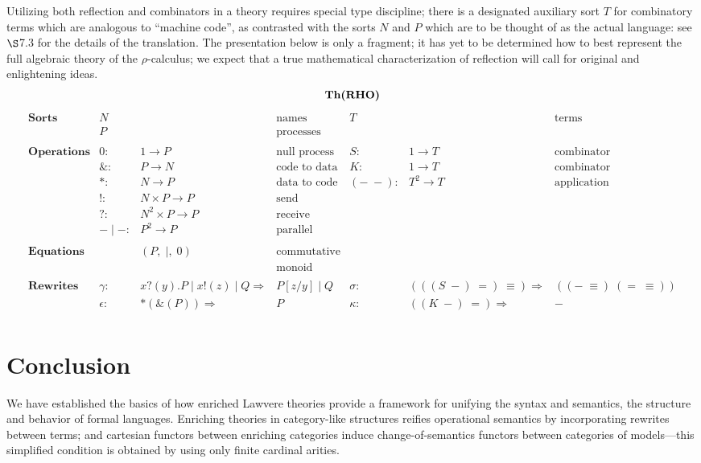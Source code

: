 \documentclass{amsart}
\theoremstyle{definition}
\newcommand{\maps}{\colon}
\begin{document}
Utilizing both reflection and combinators in a theory requires special type discipline; there is a designated auxiliary sort $T$ for combinatory terms which are analogous to ``machine code'', as contrasted with the sorts $N$ and $P$ which are to be thought of as the actual language: see \cite{roswelt} $\S$7.3 for the details of the translation. The presentation below is only a fragment; it has yet to be determined how to best represent the full algebraic theory of the $\rho$-calculus; we expect that a true mathematical characterization of reflection will call for original and enlightening ideas.\\

\[\textbf{\text{Th(RHO)}}\]
\[\begin{array}{lrllrll}
	\textbf{Sorts} & N && \text{names} & T && \text{terms}\\
	& P && \text{processes} &&&\\\\
	\textbf{Operations} & 0\maps & 1 \to P & \text{null process} & S\maps & 1\to T & \text{combinator}\\
	& \&\maps & P \to N & \text{code to data} & K\maps & 1\to T & \text{combinator}\\
	& *\maps & N \to P & \text{data to code} & (-\;-)\maps & T^2 \to T & \text{application}\\
	& !\maps & N\times P \to P & \text{send} &&&\\
	& ?\maps & N^2\times P \to P & \text{receive} &&&\\
		& -\; |\; - \maps & P^2 \to P & \text{parallel} &&&\\\\
	\textbf{Equations} && (P,\; |,\; 0) & \text{commutative} &&&\\
	&&& \text{monoid} &&&\\\\
	\textbf{Rewrites} & \gamma\maps & x?(y).P\; |\; x!(z)\; |\; Q \Rightarrow & P[z/y]\; |\; Q & \sigma\maps & (((S\; -)\; =)\; \equiv) \Rightarrow & ((-\; \equiv)\;(=\; \equiv))\\
	& \epsilon\maps & *(\&(P)) \Rightarrow & P & \kappa\maps & ((K\; -)\; =) \Rightarrow & -\\
\end{array}\]

\section{Conclusion}

We have established the basics of how enriched Lawvere theories provide a framework for unifying the syntax and semantics, the structure and behavior of formal languages. Enriching theories in category-like structures reifies operational semantics by incorporating rewrites between terms; and cartesian functors between enriching categories induce change-of-semantics functors between categories of models---this simplified condition is obtained by using only finite cardinal arities.
\end{document}
